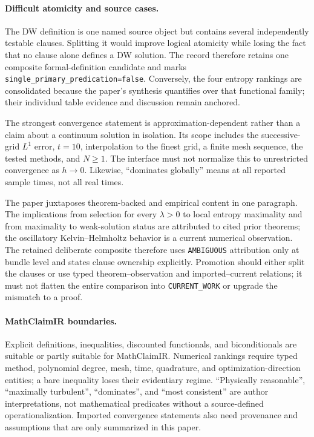 \paragraph{Difficult atomicity and source cases.}
The DW definition is one named source object but contains several independently testable clauses. Splitting it would improve logical atomicity while losing the fact that no clause alone defines a DW solution. The record therefore retains one composite formal-definition candidate and marks \texttt{single\_primary\_predication=false}. Conversely, the four entropy rankings are consolidated because the paper's synthesis quantifies over that functional family; their individual table evidence and discussion remain anchored.

The strongest convergence statement is approximation-dependent rather than a claim about a continuum solution in isolation. Its scope includes the successive-grid $L^1$ error, $t=10$, interpolation to the finest grid, a finite mesh sequence, the tested methods, and $N\geq1$. The interface must not normalize this to unrestricted convergence as $h\to0$. Likewise, ``dominates globally'' means at all reported sample times, not all real times.

The paper juxtaposes theorem-backed and empirical content in one paragraph. The implications from selection for every $\lambda>0$ to local entropy maximality and from maximality to weak-solution status are attributed to cited prior theorems; the oscillatory Kelvin--Helmholtz behavior is a current numerical observation. The retained deliberate composite therefore uses \texttt{AMBIGUOUS} attribution only at bundle level and states clause ownership explicitly. Promotion should either split the clauses or use typed theorem--observation and imported--current relations; it must not flatten the entire comparison into \texttt{CURRENT\_WORK} or upgrade the mismatch to a proof.

\paragraph{MathClaimIR boundaries.}
Explicit definitions, inequalities, discounted functionals, and biconditionals are suitable or partly suitable for MathClaimIR. Numerical rankings require typed method, polynomial degree, mesh, time, quadrature, and optimization-direction entities; a bare inequality loses their evidentiary regime. ``Physically reasonable'', ``maximally turbulent'', ``dominates'', and ``most consistent'' are author interpretations, not mathematical predicates without a source-defined operationalization. Imported convergence statements also need provenance and assumptions that are only summarized in this paper.

